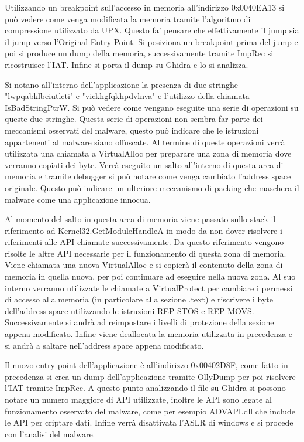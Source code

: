 \documentclass[a4paper,12pt]{article}
\begin{document}
Utilizzando un breakpoint sull'accesso in memoria all'indirizzo 0x0040EA13 si può vedere come venga modificata la memoria tramite l'algoritmo di compressione utilizzato da UPX. Questo fa' pensare che effettivamente il jump sia il jump verso l'Original Entry Point. Si posiziona un breakpoint prima del jump e poi si produce un dump della memoria, successivamente tramite ImpRec si ricostruisce l'IAT.
Infine si porta il dump su Ghidra e lo si analizza.

Si notano all'interno dell'applicazione la presenza di due stringhe "lwpqabklbeiutlcti" e "vickhgfqkhpdvlnva" e l'utilizzo della chiamata IsBadStringPtrW. Si può vedere come vengano eseguite una serie di operazioni su queste due stringhe. Questa serie di operazioni non sembra far parte dei meccanismi osservati del malware, questo può indicare che le istruzioni appartenenti al malware siano offuscate. 
Al termine di queste operazioni verrà utilizzata una chiamata a VirtualAlloc per preparare una zona di memoria dove verranno copiati dei byte.  Verrà eseguito un salto all'interno di questa area di memoria e tramite debugger si può notare come venga cambiato l'address space originale. Questo può indicare un ulteriore meccanismo di packing che maschera il malware come una applicazione innocua.

Al momento del salto in questa area di memoria viene passato sullo stack il riferimento ad Kernel32.GetModuleHandleA in modo da non dover risolvere i riferimenti alle API chiamate successivamente. Da questo riferimento vengono risolte le altre API necessarie per il funzionamento di questa zona di memoria. Viene chiamata una nuova VirtualAlloc e si copierà il contenuto della zona di memoria in quella nuova, per poi continuare ad eseguire nella nuova zona. Al suo interno verranno utilizzate le chiamate a VirtualProtect per cambiare i permessi di accesso alla memoria (in particolare alla sezione .text) e riscrivere i byte dell'address space utilizzando le istruzioni REP STOS e REP MOVS. Successivamente si andrà ad reimpostare i livelli di protezione della sezione appena modificato. Infine viene deallocata la memoria utilizzata in precedenza e si andrà a saltare nell'address space appena modificato.

Il nuovo entry point dell'applicazione è all'indirizzo 0x00402D8F, come fatto in precedenza si crea un dump dell'applicazione tramite OllyDump per poi risolvere l'IAT tramite ImpRec. A questo punto analizzando il file su Ghidra si possono notare un numero maggiore di API utilizzate, inoltre le API sono legate al funzionamento osservato del malware, come per esempio ADVAPI.dll che include le API per criptare dati. Infine verrà disattivata l'ASLR di windows e si procede con l'analisi del malware. 
\end{document}
